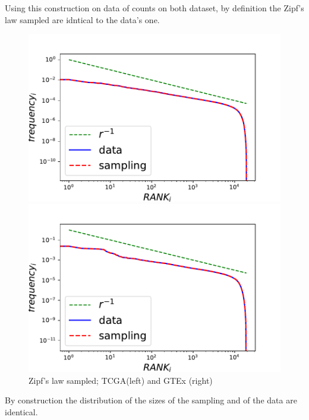 Using this construction on data of counts on both dataset, by definition the Zipf's law sampled are idntical to the data's one.
\begin{figure}[htb!]
\begin{minipage}{0.5\textwidth}
    \centering
    \includegraphics[width=0.95\linewidth]{pictures/structure/tcga/globalzipf_null.pdf}
\end{minipage}
\hspace{2mm}
\begin{minipage}{0.5\textwidth}
    \centering
    \includegraphics[width=0.95\linewidth]{pictures/structure/gtex/globalzipf_null.pdf}
\end{minipage}
\caption{Zipf's law sampled; TCGA(left) and GTEx (right)}
\label{fig:structure/globalzipf_null}
\end{figure}
By construction the distribution of the sizes of the sampling and of the data are identical.
